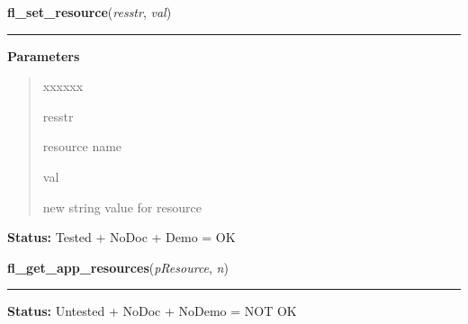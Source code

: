     \label{xformslib:library:fl_set_resource}

    \vspace{0.5ex}

\hspace{.8\funcindent}\begin{boxedminipage}{\funcwidth}

    \raggedright \textbf{fl\_set\_resource}(\textit{resstr}, \textit{val})

    \vspace{-1.5ex}

    \rule{\textwidth}{0.5\fboxrule}
\setlength{\parskip}{2ex}
\setlength{\parskip}{1ex}
      \textbf{Parameters}
      \vspace{-1ex}

      \begin{quote}
        \begin{Ventry}{xxxxxx}

          \item[resstr]

          resource name

          \item[val]

          new string value for resource

        \end{Ventry}

      \end{quote}

\textbf{Status:} Tested + NoDoc + Demo = OK



    \end{boxedminipage}

    \label{xformslib:library:fl_get_app_resources}

    \vspace{0.5ex}

\hspace{.8\funcindent}\begin{boxedminipage}{\funcwidth}

    \raggedright \textbf{fl\_get\_app\_resources}(\textit{pResource}, \textit{n})

    \vspace{-1.5ex}

    \rule{\textwidth}{0.5\fboxrule}
\setlength{\parskip}{2ex}
\setlength{\parskip}{1ex}
\textbf{Status:} Untested + NoDoc + NoDemo = NOT OK



    \end{boxedminipage}


